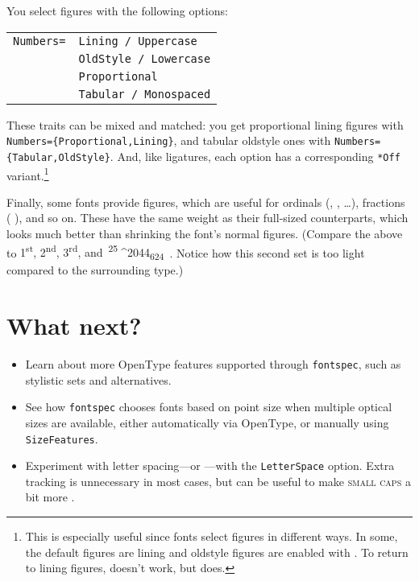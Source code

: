 You select figures with the following options:
\begin{leftfigure}
\begin{tabular}{l l}
\texttt{Numbers=} & \texttt{Lining / Uppercase} \\
 & \texttt{OldStyle / Lowercase} \\
 & \texttt{Proportional} \\
 & \texttt{Tabular / Monospaced}
\end{tabular}
\end{leftfigure}
These traits can be mixed and matched:
you get proportional lining figures
with \texttt{Numbers=\{Proportional,\allowbreak Lining\}},
and tabular oldstyle ones with \texttt{Numbers=\{Tabular,\allowbreak OldStyle\}}.
And, like ligatures, each option has a corresponding \verb|*Off|
variant.\punckern\footnote{This is especially useful since fonts
select figures in different ways.
In some, the default figures are lining
and oldstyle figures are enabled with
.
To return to lining figures,
doesn't work, but
does.}

Finally, some fonts provide  figures,
which are useful for ordinals
(,  , \ldots),
fractions (\,\,), and so on.
These have the same weight as their full-sized counterparts,
which looks much better than shrinking the font's normal figures.
(Compare the above to
{%
\mbox{1\textsuperscript{st}},
\mbox{2\textsuperscript{nd}},
\mbox{3\textsuperscript{rd}},
and
\,\mbox{\textsuperscript{25}^^^^2044\textsubscript{624}}%
\,}.
Notice how this second set is too light compared to the surrounding
type.)

\section{What next?}
\begin{itemize}
\item Learn about more OpenType features supported through \texttt{fontspec},
such as stylistic sets and alternatives.
\item See how \texttt{fontspec} chooses fonts based on point size when multiple
    optical sizes are available, either automatically via OpenType,
    or manually using \texttt{SizeFeatures}.
\item Experiment with letter spacing---or ---with
    the \texttt{LetterSpace} option.
    Extra tracking is unnecessary in most cases,
    but can be useful to make \textsc{small caps}
    a bit more .
\end{itemize}
